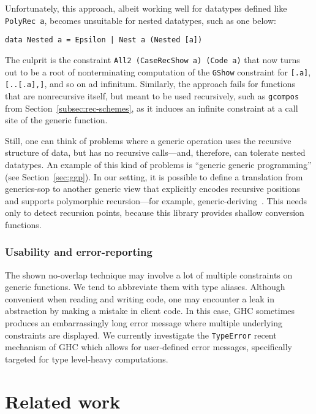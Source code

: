 \documentclass[runningheads]{llncs}
\newcommand{\K}[1]{\lstinline[style=fancy]{#1}}
\begin{document}
Unfortunately, this approach, albeit working well for datatypes defined like \K{PolyRec a}, becomes unsuitable for nested datatypes, such as one below:
\begin{lstlisting}[style=fancy]
data Nested a = Epsilon | Nest a (Nested [a])
\end{lstlisting}
The culprit is the constraint \K{All2 (CaseRecShow a) (Code a)} that now turns out to be a root of nonterminating computation of the \K{GShow} constraint for \K{[.a]}, \K{[..[.a],]}, and so on ad infinitum. Similarly, the approach fails for functions that are nonrecursive itself, but meant to be used recursively, such as \K{gcompos} from Section~\ref{subsec:rec-schemes}, as it induces an infinite constraint at a call site of the generic function.

Still, one can think of problems where a generic operation uses the recursive structure of data, but has no recursive calls---and, therefore, can tolerate nested datatypes. An example of this kind of problems is ``generic generic programming'' (see Section~\ref{sec:ggp}). In our setting, it is possible to define a translation from \textsf{generics-sop} to another generic view that explicitly encodes recursive positions and supports polymorphic recursion---for example, \textsf{generic-deriving}~\cite{Magalhaes2010}. This needs only to detect recursion points, because this library provides shallow conversion functions.

\subsubsection{Usability and error-reporting}

The shown no-overlap technique may involve a lot of multiple constraints on generic functions. We tend to abbreviate them with type aliases. Although convenient when reading and writing code, one may encounter a leak in abstraction by making a mistake in client code. In this case, GHC sometimes produces an embarrassingly long error message where multiple underlying constraints are displayed. We currently investigate the \K{TypeError} recent mechanism of GHC which allows for user-defined error messages, specifically targeted for type level-heavy computations.

\section{Related work}
\label{sec:related-work}
\end{document}
